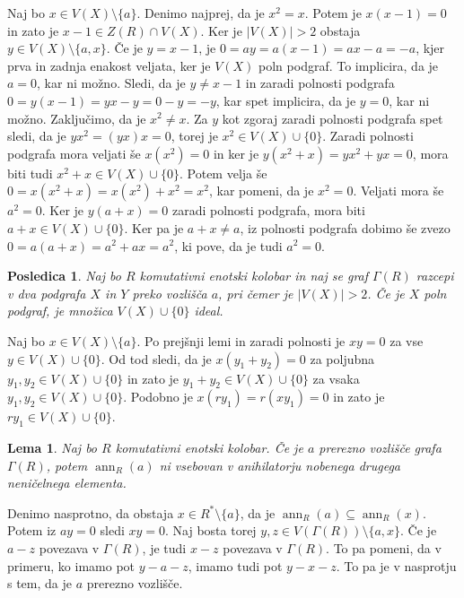 \documentclass[a4paper, 12pt]{amsart}
\theoremstyle{definition} %
\theoremstyle{plain} %
\newtheorem{lema}[definicija]{Lema}
\newtheorem{posledica}[definicija]{Posledica}
\DeclareMathOperator{\ann}{ann}
\begin{document}
\proof
Naj bo $x\in V(X)\setminus \{a\}$. Denimo najprej, da je $x^2 = x$. Potem je $x(x-1) = 0$ in zato je $x-1\in Z(R) \cap V(X)$. Ker je $|V(X)|> 2$ obstaja $y\in V(X)\setminus \{a,x\}$. Če je $y = x-1$, je $0 = ay = a(x-1) = ax - a = -a$, kjer prva in zadnja enakost veljata, ker je $V(X)$ poln podgraf. To implicira, da je $a=0$, kar ni možno. Sledi, da je $y\neq x-1$ in zaradi polnosti podgrafa $0 = y(x-1) = yx-y = 0-y = -y$, kar spet implicira, da je $y=0$, kar ni možno. Zaključimo, da je $x^2 \neq x$. Za $y$ kot zgoraj zaradi polnosti podgrafa spet sledi, da je $yx^2 = (yx)x = 0$, torej je $x^2 \in V(X)\cup\{0\}$. Zaradi polnosti podgrafa mora veljati še $x(x^2)=0$ in ker je $y(x^2 + x ) = yx^2 + yx =0 $, mora biti tudi $x^2 + x\in V(X) \cup \{0\}$. Potem velja še  $0 = x(x^2 + x) = x(x^2) + x^2 = x^2$, kar pomeni, da je $x^2 = 0$. Veljati mora še $a^2 = 0$. Ker je $y(a+x) = 0 $ zaradi polnosti podgrafa, mora biti $a+x\in V(X) \cup\{0\}$. Ker pa je $a+x \neq a$, iz polnosti podgrafa dobimo še zvezo $0 = a(a+x) = a^2 + ax = a^2$, ki pove, da je tudi $a^2 = 0$.
\endproof

\begin{posledica}
Naj bo $R$ komutativni enotski kolobar in naj se graf $\Gamma(R)$ razcepi v dva podgrafa $X$ in $Y$ preko vozlišča $a$, pri čemer je $|V(X)|>2$. Če je $X$ poln podgraf, je množica $V(X)\cup \{0\}$ ideal.
\end{posledica}

\proof
Naj bo $x\in V(X)\setminus\{a\}$. Po prejšnji lemi in zaradi polnosti je $xy=0$ za vse $y\in V(X)\cup\{0\}$. Od tod sledi, da je $x(y_1 + y_2) = 0$ za poljubna $y_1,y_2 \in V(X)\cup \{0\}$ in zato je $y_1 + y_2 \in V(X) \cup\{0\}$ za vsaka $y_1,y_2\in V(X)\cup\{0\}$. Podobno je $x(ry_1) = r(xy_1 ) =0$ in zato je $ry_1\in V(X) \cup\{0\}$.
\endproof

\begin{lema}
\label{cutVertexMaxAnn}
Naj bo $R$ komutativni enotski kolobar. Če je $a$ prerezno vozlišče grafa $\Gamma(R)$, potem $\ann_R(a)$ ni vsebovan v anihilatorju nobenega drugega neničelnega elementa.
\end{lema}

\proof
Denimo nasprotno, da obstaja $x\in R^*\setminus\{a\}$, da je $\ann_R(a) \subseteq \ann_R(x)$. Potem iz $ay = 0$ sledi $xy = 0$. Naj bosta torej $y,z \in V(\Gamma(R)) \setminus \{a,x\}$. Če je $a-z$ povezava v $\Gamma(R)$, je tudi $x-z$ povezava v $\Gamma(R)$. To pa pomeni, da v primeru, ko imamo pot $y-a-z$, imamo tudi pot $y-x-z$. To pa je v nasprotju s tem, da je $a$ prerezno vozlišče.
\endproof
\end{document}
